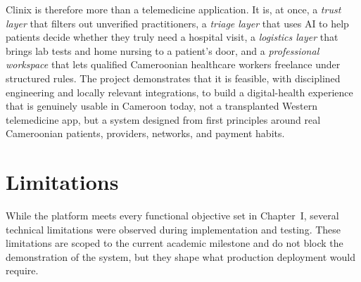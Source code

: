 Clinix is therefore more than a telemedicine application. It is, at once, a \emph{trust layer} that filters out unverified practitioners, a \emph{triage layer} that uses AI to help patients decide whether they truly need a hospital visit, a \emph{logistics layer} that brings lab tests and home nursing to a patient's door, and a \emph{professional workspace} that lets qualified Cameroonian healthcare workers freelance under structured rules. The project demonstrates that it is feasible, with disciplined engineering and locally relevant integrations, to build a digital-health experience that is genuinely usable in Cameroon today, not a transplanted Western telemedicine app, but a system designed from first principles around real Cameroonian patients, providers, networks, and payment habits.

\section{Limitations}

While the platform meets every functional objective set in Chapter~I, several technical limitations were observed during implementation and testing. These limitations are scoped to the current academic milestone and do not block the demonstration of the system, but they shape what production deployment would require.


